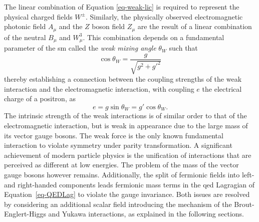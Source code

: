 The linear combination of Equation \ref{eq-weak-lic} is required to represent the physical charged fields $W^{\pm}$. Similarly, the physically observed electromagnetic photonic field $A_{\mu}$ and the $Z$ boson field $Z_{\mu}$ are the result of a linear combination of the neutral $B_{\mu}$ and $W_{\mu}^3$. This combination depends on a fundamental parameter of the \gls{sm} called the \textit{weak mixing angle} $\theta_W$ such that
\begin{equation}\label{eq-weakmixangle}
    \cos\theta_W = \frac{g}{\sqrt{g^2 +g'^2}}
\end{equation}
thereby establishing a connection between the coupling strengths of the weak interaction and the electromagnetic interaction, with coupling $e$ the electrical charge of a positron, as \[e = g \sin \theta_W = g' \cos\theta_W.\] The intrinsic strength of the weak interactions is of similar order to that of the electromagnetic interaction, but is weak in appearance due to the large mass of its vector gauge bosons. The weak force is the only known fundamental interaction to violate symmetry under parity transformation. A significant achievement of modern particle physics is the unification of interactions that are perceived as different at low energies. The problem of the mass of the vector gauge bosons however remains. Additionally, the split of fermionic fields into left- and right-handed components leads fermionic mass terms in the \gls{qed} Lagragian of Equation~\ref{eq-QEDLag} to violate the gauge invariance. Both issues are resolved by considering an additional scalar field introducing the mechanism of the Brout-Englert-Higgs and Yukawa interactions, as explained in the following sections.

